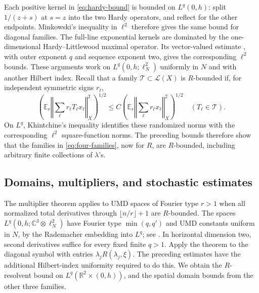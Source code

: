 \documentclass[11pt]{article}
\numberwithin{equation}{section}
\theoremstyle{remark}
\newcommand{\R}{\mathbb R}
\newcommand{\C}{\mathbb C}
\newcommand{\EE}{\mathbb E}
\begin{document}
Each positive kernel in \eqref{eq:hardy-bound} is bounded on $L^q(0,h)$:
split $1/(z+s)$ at $s=z$ into the two Hardy operators, and reflect for
the other endpoints. Minkowski's inequality in $\ell^2$ therefore
gives the same bound for diagonal families. The full-line exponential
kernels are dominated by the one-dimensional Hardy--Littlewood maximal
operator. Its vector-valued estimate
\cite[Theorem 1]{DK}, with outer exponent $q$ and sequence exponent two,
gives the corresponding $\ell^2$ bounds. These arguments work on
$L^q(0,h;\ell^2_N)$ uniformly in $N$ and with another Hilbert index.
Recall that a family $\mathcal T\subset\mathcal L(X)$ is
$R$-bounded if, for independent symmetric signs $r_\ell$,
\[
 \left(\EE_r\left\Vert\sum_\ell r_\ell T_\ell x_\ell\right\Vert_X^2\right)^{1/2}
 \leq C\left(\EE_r\left\Vert\sum_\ell r_\ell x_\ell\right\Vert_X^2\right)^{1/2}
 \quad(T_\ell\in\mathcal T).
\]
On $L^q$, Khintchine's inequality identifies these randomized norms
with the corresponding $\ell^2$ square-function norms. The preceding
bounds therefore show that the families in \eqref{eq:four-families},
now for $R$, are $R$-bounded, including arbitrary finite collections
of $\lambda$'s.

\subsection{Domains, multipliers, and stochastic estimates}\label{sec:channel-consumer}

The multiplier theorem \cite[Corollary 4.4]{GW} applies to UMD spaces
of Fourier type $r>1$ when all normalized total derivatives through
$\lfloor n/r\rfloor+1$ are $R$-bounded. The spaces
$L^q(0,h;\C^3\otimes\ell^2_N)$ have Fourier type
$\min(q,q')$ and UMD constants uniform in $N$, by the Rademacher
embedding into $L^q$; see \cite[Remarks 2.3, 2.6, 2.10]{GW}.
In horizontal dimension two, second derivatives suffice for every
fixed finite $q>1$. Apply the theorem to the diagonal symbol with
entries $\lambda_jR(\lambda_j,\xi)$. The preceding estimates have the
additional Hilbert-index uniformity required to do this. We obtain
the $R$-resolvent bound on $L^q(\R^2\times(0,h))$, and the spatial
domain bounds from the other three families.
\end{document}
